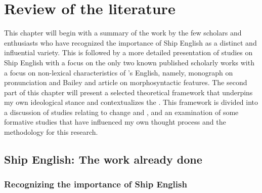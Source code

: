 \chapter{{Review of the literature}}

This chapter will begin with a summary of the work by the few scholars and enthusiasts who have recognized the importance of Ship English as a distinct and influential variety. This is followed by a more detailed presentation of studies on Ship English with a focus on the only two known published scholarly works with a focus on non-lexical characteristics of  ’s English, namely,  monograph on pronunciation and Bailey and  article on morphosyntactic features. The second part of this chapter will present a selected theoretical framework that underpins my own ideological stance and contextualizes the . This framework is divided into a discussion of studies relating to  change and , and an examination of some formative studies that have influenced my own thought process and the methodology for this research. 

\section{{Ship English: The work already done}}\label{sec:2.1}

\subsection{{Recognizing the importance of Ship English}}\label{sec:2.1.1}

